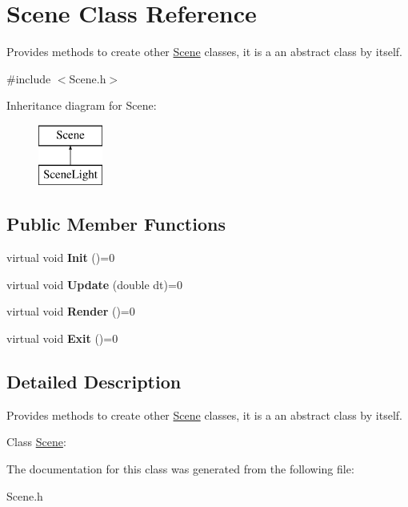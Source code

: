 \hypertarget{class_scene}{\section{Scene Class Reference}
\label{class_scene}
}


Provides methods to create other \hyperlink{class_scene}{Scene} classes, it is a an abstract class by itself.  




{\ttfamily \#include $<$Scene.\+h$>$}

Inheritance diagram for Scene\+:\begin{figure}[H]
\begin{center}
\leavevmode
\includegraphics[height=2.000000cm]{class_scene}
\end{center}
\end{figure}
\subsection*{Public Member Functions}
\begin{DoxyCompactItemize}
\item 
\hypertarget{class_scene_ac3c4677dfd702a3ffd5ffadd3f1ac478}{virtual void {\bfseries Init} ()=0}\label{class_scene_ac3c4677dfd702a3ffd5ffadd3f1ac478}

\item 
\hypertarget{class_scene_af5c6bcf2185087fb32c27fb8f6a18d91}{virtual void {\bfseries Update} (double dt)=0}\label{class_scene_af5c6bcf2185087fb32c27fb8f6a18d91}

\item 
\hypertarget{class_scene_ae24d21e12b34839994ad265662ea24d7}{virtual void {\bfseries Render} ()=0}\label{class_scene_ae24d21e12b34839994ad265662ea24d7}

\item 
\hypertarget{class_scene_aae8e24654ef98c79961c2b804b12852c}{virtual void {\bfseries Exit} ()=0}\label{class_scene_aae8e24654ef98c79961c2b804b12852c}

\end{DoxyCompactItemize}


\subsection{Detailed Description}
Provides methods to create other \hyperlink{class_scene}{Scene} classes, it is a an abstract class by itself. 

Class \hyperlink{class_scene}{Scene}\+: 

The documentation for this class was generated from the following file\+:\begin{DoxyCompactItemize}
\item 
Scene.\+h\end{DoxyCompactItemize}
